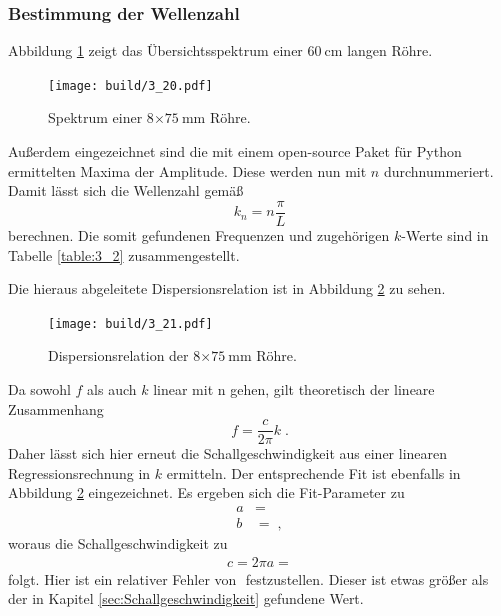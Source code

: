 \subsubsection{Bestimmung der Wellenzahl}
Abbildung \ref{fig:3_20} zeigt das Übersichtsspektrum einer $\SI{60}{\centi\meter}$ langen Röhre.
\begin{figure}
  \centering  \texttt{[image: build/3\_20.pdf]}  \caption{Spektrum einer 8$\times\SI{75}{\milli\meter}$ Röhre.} \label{fig:3_20}
\end{figure}
Außerdem eingezeichnet sind die mit einem open-source Paket für Python \cite{peakdetect} ermittelten Maxima der Amplitude. Diese werden nun mit $n$ durchnummeriert. Damit lässt sich die Wellenzahl gemäß
\begin{equation}
  k_n = n\frac{\pi}{L}
  \label{eq:k_von_n}
\end{equation}
berechnen. Die somit gefundenen Frequenzen und zugehörigen $k$-Werte sind in Tabelle \ref{table:3_2} zusammengestellt.

Die hieraus abgeleitete Dispersionsrelation ist in Abbildung \ref{fig:3_21} zu sehen.
\begin{figure}
  \centering  \texttt{[image: build/3\_21.pdf]}  \caption{Dispersionsrelation der 8$\times\SI{75}{\milli\meter}$ Röhre.} \label{fig:3_21}
\end{figure}
Da sowohl $f$ als auch $k$ linear mit n gehen, gilt theoretisch der lineare Zusammenhang
\begin{equation}
  f = \frac{c}{2\pi}k \; .
\end{equation}
Daher lässt sich hier erneut die Schallgeschwindigkeit aus einer linearen Regressionsrechnung in $k$ ermitteln. Der entsprechende Fit ist ebenfalls in Abbildung \ref{fig:3_21} eingezeichnet. Es ergeben sich die Fit-Parameter zu
\begin{align*}
  a &=  \\
  b &=  \; ,
\end{align*}
woraus die Schallgeschwindigkeit zu
\begin{align}
  c = 2\pi a = 
\end{align}
folgt. Hier ist ein relativer Fehler von $$ festzustellen. Dieser ist etwas größer als der in Kapitel \ref{sec:Schallgeschwindigkeit} gefundene Wert.

